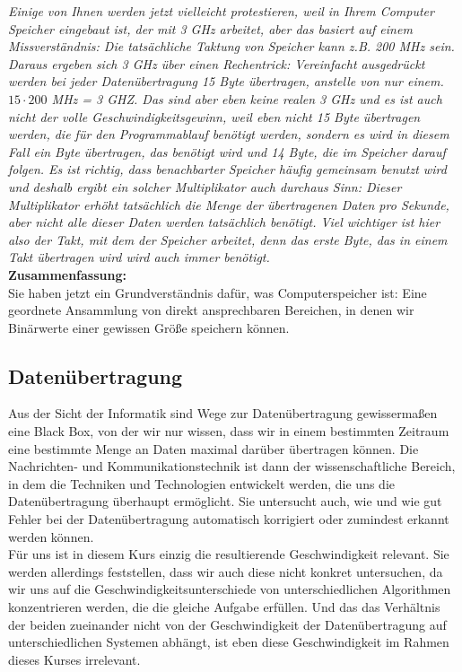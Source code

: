 \emph{Einige von Ihnen werden jetzt vielleicht protestieren, weil in Ihrem Computer Speicher eingebaut ist, der mit 3 GHz arbeitet, aber das basiert auf einem Missverständnis: Die tatsächliche Taktung von Speicher kann z.B. 200 MHz sein. Daraus ergeben sich \glqq{}3 GHz\grqq{} über einen Rechentrick: Vereinfacht ausgedrückt werden bei jeder Datenübertragung 15 Byte übertragen, anstelle von nur einem. \(15 \cdot 200\) MHz = 3 GHZ. Das sind aber eben keine realen 3 GHz und es ist auch nicht der volle Geschwindigkeitsgewinn, weil eben nicht 15 Byte übertragen werden, die für den Programmablauf benötigt werden, sondern es wird in diesem Fall ein Byte übertragen, das benötigt wird und 14 Byte, die im Speicher darauf folgen. Es ist richtig, dass benachbarter Speicher häufig gemeinsam benutzt wird und deshalb ergibt ein solcher Multiplikator auch durchaus Sinn: Dieser Multiplikator erhöht tatsächlich die Menge der übertragenen Daten pro Sekunde, aber nicht alle dieser Daten werden tatsächlich benötigt. Viel wichtiger ist hier also der Takt, mit dem der Speicher arbeitet, denn das erste Byte, das in einem Takt übertragen wird wird auch immer benötigt.}\\

\textbf{Zusammenfassung:}\\

Sie haben jetzt ein Grundverständnis dafür, was Computerspeicher ist: Eine geordnete Ansammlung von direkt ansprechbaren Bereichen, in denen wir Binärwerte einer gewissen Größe speichern können.

\subsection{Datenübertragung}

Aus der Sicht der Informatik sind Wege zur Datenübertragung gewissermaßen eine Black Box, von der wir nur wissen, dass wir in einem bestimmten Zeitraum eine bestimmte Menge an Daten maximal darüber übertragen können. Die Nachrichten- und Kommunikationstechnik ist dann der wissenschaftliche Bereich, in dem die Techniken und Technologien entwickelt werden, die uns die Datenübertragung überhaupt ermöglicht. Sie untersucht auch, wie und wie gut Fehler bei der Datenübertragung automatisch korrigiert oder zumindest erkannt werden können.\\

Für uns ist in diesem Kurs einzig die resultierende Geschwindigkeit relevant. Sie werden allerdings feststellen, dass wir auch diese nicht konkret untersuchen, da wir uns auf die Geschwindigkeitsunterschiede von unterschiedlichen Algorithmen konzentrieren werden, die die gleiche Aufgabe erfüllen. Und das das Verhältnis der beiden zueinander nicht von der Geschwindigkeit der Datenübertragung auf unterschiedlichen Systemen abhängt, ist eben diese Geschwindigkeit im Rahmen dieses Kurses irrelevant.

